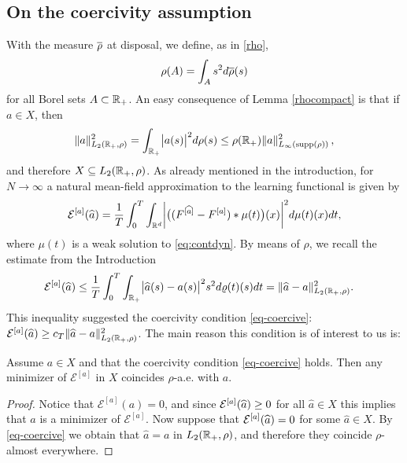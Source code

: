 \subsection{On the coercivity assumption}\label{sec:coerc}

With the measure $\overline\rho$ at disposal, we define, as in \eqref{rho},  $$\rho(A) = \int_{A} s^2 d\overline\rho(s)$$ for all Borel sets $A \subset \mathbb{R}_+$.  An easy consequence of Lemma \ref{rhocompact} is that if $a\in X$, then
\begin{align}\label{eq:inftyimplyl2}
\|a\|^2_{L_2(\mathbb{R}_+,\rho)} = \int_{\mathbb{R}_+} \bigl|a(s)\bigr|^2 d\rho(s) \leq \rho(\mathbb R_+)\|a\|^2_{L_{\infty}(\operatorname{supp}(\rho))}\,,
\end{align}
and therefore $X\subseteq L_2(\mathbb{R}_+,\rho)$.  
As already mentioned in the introduction, for $N \to \infty$ a natural mean-field approximation to the learning functional is given by
\begin{align*}
	\mathcal E^{[a]}(\widehat a)=\frac{1}{T}\int_0^T \int_{\mathbb{R}^d} \biggl|\bigl((F^{[\widehat a]}-F^{[a]})\ast\mu(t)\bigr)(x)\biggr|^2d\mu(t)(x)dt,
\end{align*}
where $\mu(t)$ is a weak solution to \eqref{eq:contdyn}. 
By means of $\rho$, we recall the estimate from the Introduction
\begin{align}
\begin{split}\label{eq-rho-3}
	\mathcal E^{[a]}(\widehat a)&\leq\frac{1}{T}\int_0^T\int_{\mathbb{R}_+}\bigl|\widehat a(s)-a(s)\bigr|^2 s^2 d\varrho(t)(s) dt = \|\widehat a-a\|^2_{L_2(\mathbb{R}_+,\rho)}.
\end{split}
\end{align}
This inequality suggested the coercivity condition \eqref{eq-coercive}: 
$
	\mathcal E^{[a]}(\widehat a)\geq c_T\|\widehat a-a\|^2_{L_2(\mathbb{R}_+,\rho)}
$.
The main reason this condition is of interest to us is:

\begin{proposition}\label{uniquemin}
Assume $a \in X$ and that the coercivity condition \eqref{eq-coercive} holds. Then any minimizer of $\mathcal E^{[a]}$ in $X$ coincides $\rho$-a.e. with $a$.
\end{proposition}
\begin{proof}
Notice that $\mathcal E^{[a]}(a)=0$, and since $\mathcal E^{[a]}(\widehat a)\geq 0$ for all $\widehat a\in X$ this implies that $a$ is a minimizer of $\mathcal E^{[a]}$. Now suppose that $ \mathcal E^{[a]}(\widehat a)=0$ for some $\widehat a\in X$. By \eqref{eq-coercive} we obtain that $\widehat a=a$ in $L_2(\mathbb{R}_+,\rho)$, and therefore they coincide $\rho$-almost everywhere. %
\end{proof}


